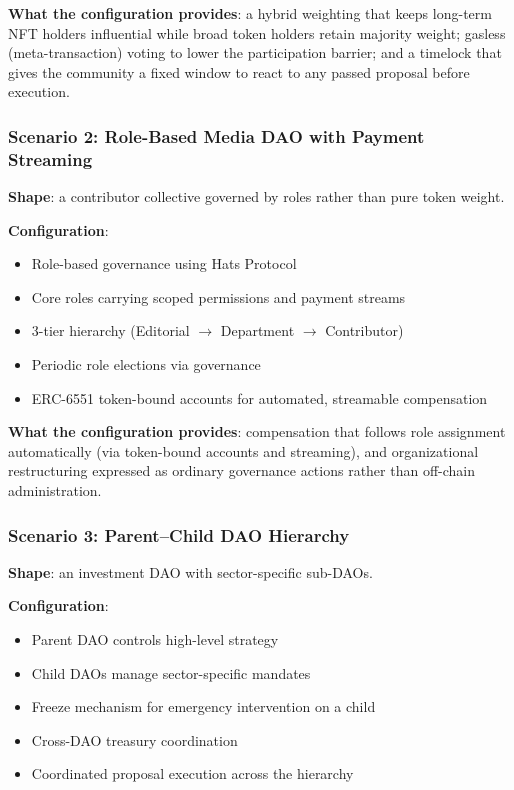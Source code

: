 \textbf{What the configuration provides}: a hybrid weighting that keeps
long-term NFT holders influential while broad token holders retain
majority weight; gasless (meta-transaction) voting to lower the
participation barrier; and a timelock that gives the community a fixed
window to react to any passed proposal before execution.

\subsubsection{Scenario 2: Role-Based Media DAO with Payment Streaming}

\textbf{Shape}: a contributor collective governed by roles rather than
pure token weight.

\textbf{Configuration}:
\begin{itemize}
    \item Role-based governance using Hats Protocol
    \item Core roles carrying scoped permissions and payment streams
    \item 3-tier hierarchy (Editorial $\rightarrow$ Department $\rightarrow$ Contributor)
    \item Periodic role elections via governance
    \item ERC-6551 token-bound accounts for automated, streamable compensation
\end{itemize}

\textbf{What the configuration provides}: compensation that follows
role assignment automatically (via token-bound accounts and streaming),
and organizational restructuring expressed as ordinary governance
actions rather than off-chain administration.

\subsubsection{Scenario 3: Parent--Child DAO Hierarchy}

\textbf{Shape}: an investment DAO with sector-specific sub-DAOs.

\textbf{Configuration}:
\begin{itemize}
    \item Parent DAO controls high-level strategy
    \item Child DAOs manage sector-specific mandates
    \item Freeze mechanism for emergency intervention on a child
    \item Cross-DAO treasury coordination
    \item Coordinated proposal execution across the hierarchy
\end{itemize}

